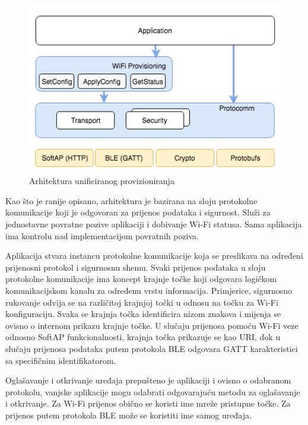 \begin{figure}[ht]
	\centering
	\includegraphics[scale=0.8]{imgs/unified_provisioning}
	\caption{Arhitektura unificiranog provizioniranja \cite{unified_provisioning}}
	\label{fig:unified_provisioning}
\end{figure}

Kao što je ranije opisano, arhitektura je bazirana na sloju protokolne komunikacije koji je odgovoran za prijenos podataka i sigurnost. Služi za jednostavne povratne pozive aplikaciji  i dobivanje Wi-Fi statusa. Sama aplikacija ima kontrolu nad implementacijom povratnih poziva. 

Aplikacija stvara instancu protokolne komunikacije koja se preslikava na određeni prijenosni protokol i sigurnosnu shemu. Svaki prijenos podataka u sloju protokolne komunikacije ima koncept krajnje točke  koji odgovara logičkom komunikacijskom kanalu za određenu vrstu informacija. Primjerice, sigurnosno rukovanje  odvija se na različitoj krajnjoj točki u odnosu na točku za Wi-Fi konfiguraciju. Svaka se krajnja točka identificira nizom znakova i mijenja se ovisno o internom prikazu krajnje točke. U slučaju prijenosa pomoću Wi-Fi veze odnosno SoftAP funkcionalnosti, krajnja točka prikazuje se kao URI, dok u slučaju prijenosa podataka putem protokola BLE odgovara GATT karakteristici sa specifičnim identifikatorom. 

Oglašavanje i otkrivanje uređaja prepušteno je aplikaciji i ovisno o odabranom protokolu, vanjske aplikacije mogu odabrati odgovarajuću metodu za oglašavanje i otkrivanje. Za Wi-Fi prijenos obično se koristi ime mreže pristupne točke. Za prijenos putem protokola BLE može se koristiti ime samog uređaja. 


